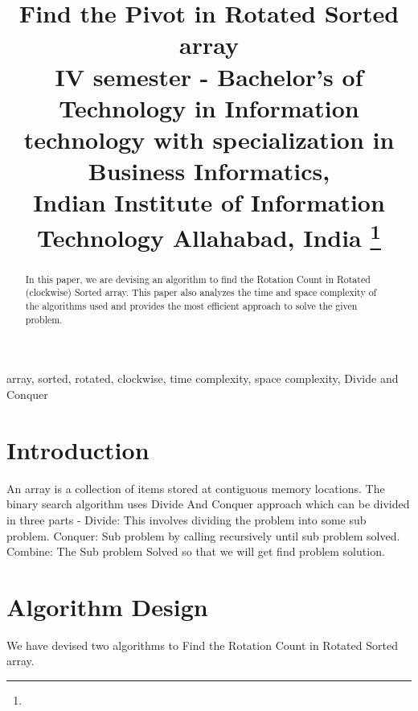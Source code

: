 \documentclass[conference]{IEEEtran}
\begin{document}
\title{Find the Pivot in Rotated Sorted array
\\
{\footnotesize {
IV semester - Bachelor’s of Technology in Information technology with specialization in Business Informatics,\\
Indian Institute of Information Technology Allahabad, India
}}
\thanks{}
}

\author{
\and
{}
\and
{}
}


\maketitle

\begin{abstract}
In this paper, we are devising an algorithm to find the Rotation Count in Rotated (clockwise) Sorted array. This paper also analyzes the time and space complexity of the algorithms used and provides the most efficient approach to solve the given problem.
\end{abstract}
\bigskip
\begin{IEEEkeywords}
array, sorted, rotated, clockwise, time complexity, space complexity, Divide and Conquer
\end{IEEEkeywords}

\section{Introduction}
An array is a collection of items stored at contiguous memory locations. The binary search algorithm uses Divide And Conquer approach which can be divided in three parts -
Divide: This involves dividing the problem into some sub problem.
Conquer: Sub problem by calling recursively until sub problem solved.
Combine: The Sub problem Solved so that we will get find problem solution.
\section{Algorithm Design}
We have devised two algorithms to Find the Rotation Count in Rotated Sorted array.
\end{document}
